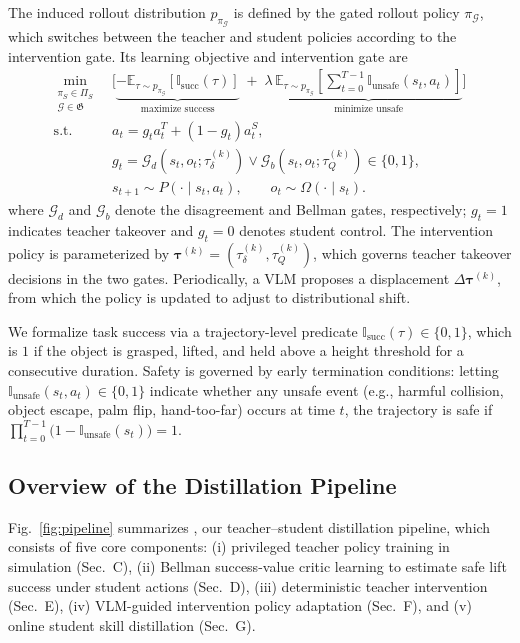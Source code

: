 The induced rollout distribution $p_{\pi_{\mathcal{G}}}$ is defined by the gated rollout policy
$\pi_{\mathcal{G}}$, which switches between the teacher and student policies
according to the intervention gate. Its learning objective and intervention
gate are
\begingroup
\small
\begin{equation}
\begin{aligned}
\min_{\substack{\pi_S\in\Pi_S\\ \mathcal{G}\in\mathfrak{G}}}
\;
&
\Bigg[
\underbrace{
-\mathbb{E}_{\tau\sim p_{\pi_{\mathcal{G}}}}\!\left[\mathbb{I}_{\mathrm{succ}}(\tau)\right]
}_{\text{maximize success}}
\;+\;
\lambda\,
\underbrace{
\mathbb{E}_{\tau\sim p_{\pi_{\mathcal{G}}}}\!\left[
\sum_{t=0}^{T-1}\mathbb{I}_{\mathrm{unsafe}}(s_t,a_t)
\right]}_{\text{minimize unsafe}}
\Bigg]
\\
\text{s.t.}\quad
&
a_t=g_t a_t^T+(1-g_t)a_t^S,\\
&
g_t=\mathcal{G}_d(s_t,o_t;\tau_\delta^{(k)})
\lor\mathcal{G}_b(s_t,o_t;\tau_Q^{(k)})\in\{0,1\},\\
&
s_{t+1}\sim P(\cdot\mid s_t,a_t),\qquad
o_t\sim\Omega(\cdot\mid s_t).
\end{aligned}
\label{eq:vc_objective}
\end{equation}
\endgroup
where $\mathcal{G}_d$ and $\mathcal{G}_b$ denote the disagreement and Bellman
gates, respectively; $g_t=1$ indicates teacher takeover and $g_t=0$ denotes
student control.
The intervention policy is parameterized by $\boldsymbol{\tau}^{(k)}=
(\tau_\delta^{(k)},\tau_Q^{(k)})$, which governs teacher takeover decisions in
the two gates. Periodically, a VLM proposes a displacement
$\Delta\boldsymbol{\tau}^{(k)}$, from which the policy is updated to adjust to distributional shift.

We formalize task success via a trajectory-level predicate
$\mathbb{I}_{\mathrm{succ}}(\tau)\in\{0,1\}$, which is $1$ if the object is
grasped, lifted, and held above a height threshold for a consecutive duration.
Safety is governed by early termination conditions: letting
$\mathbb{I}_{\mathrm{unsafe}}(s_t,a_t)\in\{0,1\}$ indicate whether any unsafe
event (e.g., harmful collision, object escape, palm flip, hand-too-far) occurs
at time $t$, the trajectory is safe if
$\prod_{t=0}^{T-1}\big(1-\mathbb{I}_{\mathrm{unsafe}}(s_t)\big)=1$.

\subsection{Overview of the Distillation Pipeline}
Fig.~\ref{fig:pipeline} summarizes \methodname, our teacher--student distillation pipeline,
which consists of five core components: (i) privileged teacher policy training
in simulation (Sec.~C), (ii) Bellman success-value critic learning to estimate safe lift success
under student actions (Sec.~D), (iii) deterministic teacher intervention
(Sec.~E), (iv) VLM-guided intervention policy adaptation (Sec.~F), and (v) online
student skill distillation (Sec.~G).

